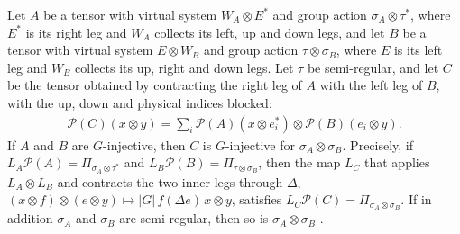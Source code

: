 \begin{lemma}%
    \label{thm:peps_g_injective_concatenation}
    \leanok
    Let $A$ be a tensor with virtual system $W_A\otimes E^*$ and group action
    $\sigma_A\otimes\tau^*$, where $E^*$ is its right leg and $W_A$ collects
    its left, up and down legs, and let $B$ be a tensor with virtual system
    $E\otimes W_B$ and group action $\tau\otimes\sigma_B$, where $E$ is its
    left leg and $W_B$ collects its up, right and down legs. Let $\tau$ be
    semi-regular, and let $C$ be the tensor obtained by contracting the right
    leg of $A$ with the left leg of $B$, with the up, down and physical
    indices blocked:
    \begin{align*}
        \mathcal{P}(C)(x\otimes y)
        =\sum_i\mathcal{P}(A)(x\otimes e_i^*)\otimes\mathcal{P}(B)(e_i\otimes y).
    \end{align*}
    If $A$ and $B$ are $G$-injective, then $C$ is $G$-injective for
    $\sigma_A\otimes\sigma_B$. Precisely, if
    $L_A\mathcal{P}(A)=\Pi_{\sigma_A\otimes\tau^*}$ and
    $L_B\mathcal{P}(B)=\Pi_{\tau\otimes\sigma_B}$, then the map $L_C$ that
    applies $L_A\otimes L_B$ and contracts the two inner legs through $\Delta$,
    $(x\otimes f)\otimes(e\otimes y)\mapsto|G|\,f(\Delta e)\,x\otimes y$,
    satisfies $L_C\mathcal{P}(C)=\Pi_{\sigma_A\otimes\sigma_B}$. If in addition
    $\sigma_A$ and $\sigma_B$ are semi-regular, then so is
    $\sigma_A\otimes\sigma_B$ \cite[Lemma~5.2]{Schuch2010PEPS}.
\end{lemma}

